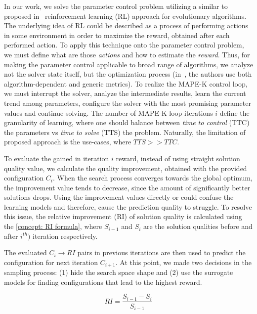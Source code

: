 In our work, we solve the parameter control problem utilizing a similar to proposed in~\cite{karafotias2014generic} reinforcement learning (RL) approach for evolutionary algorithms.
The underlying idea of RL could be described as a process of performing actions in some environment in order to maximize the reward, obtained after each performed action. To apply this technique onto the parameter control problem, we must define what are those \emph{actions} and how to estimate the \emph{reward}. Thus, for making the parameter control applicable to broad range of algorithms, we analyze not the solver state itself, but the optimization process (in~\cite{karafotias2014generic}, the authors use both algorithm-dependent and generic metrics). To realize the MAPE-K control loop, we must interrupt the solver, analyze the intermediate results, learn the current trend among parameters, configure the solver with the most promising parameter values and continue solving. The number of MAPE-K loop iterations $i$ define the granularity of learning, where one should balance between \emph{time to control} (TTC) the parameters vs \emph{time to solve} (TTS) the problem. Naturally, the limitation of proposed approach is the use-cases, where $TTS >> TTC$.


To evaluate the gained in iteration $i$ reward, instead of using straight solution quality value, we calculate the quality improvement, obtained with the provided configuration $C_i$. When the search process converges towards the global optimum, the improvement value tends to decrease, since the amount of significantly better solutions drops. Using the improvement values directly or could confuse the learning models and therefore, cause the prediction quality to struggle. To resolve this issue, the relative improvement (RI) of solution quality is calculated using the \cref{concept: RI formula}, where $S_{i-1}$ and $S_i$ are the solution qualities before and after $i^{th})$ iteration respectively.

The evaluated $C_i \rightarrow RI$ pairs in previous iterations are then used to predict the configuration for next iteration $C_{i+1}$. At this point, we made two decisions in the sampling process: (1) hide the search space shape and (2) use the surrogate models for finding configurations that lead to the highest reward.

\begin{equation}
RI = \frac{S_{i-1} - S_{i}}{S_{i-1}}
\label{concept: RI formula}
\end{equation}

